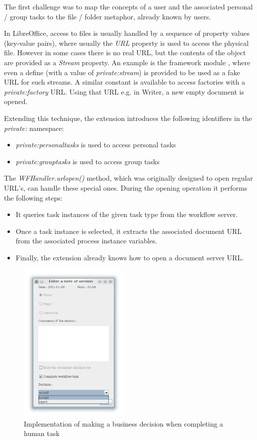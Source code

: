 The first challenge was to map the concepts of a user and the associated
personal / group tasks to the file / folder metaphor, already known by users.

In LibreOffice, access to files is usually handled by a sequence of property
values (key-value pairs), where usually the \emph{URL} property is used to
access the physical file. However in some cases there is no real URL, but the
contents of the object are provided as a \emph{Stream} property.  An example is
the framework module \cite{lo-framework-module}, where even a define (with a
value of \emph{private:stream}) is provided to be used as a fake URL for such
streams.  A similar constant is available to access factories with a
\emph{private:factory} URL. Using that URL e.g. in Writer, a new empty document
is opened.

Extending this technique, the extension introduces the following identifiers in
the \emph{private:} namespace:

\begin{itemize}
\item \emph{private:personaltasks} is used to access personal tasks
\item \emph{private:grouptasks} is used to access group tasks
\end{itemize}

The \emph{WFHandler.urlopen()} method, which was originally designed to open
regular URL's, can handle these special ones. During the opening operation it performs the following steps:

\begin{itemize}
\item It queries task instances of the given task type from the workflow server.
\item Once a task instance is selected, it extracts the associated document URL from the associated process instance variables.
\item Finally, the extension already knows how to open a document server URL.
\end{itemize}

\begin{figure}[H]
\centering
\includegraphics[width=200px,keepaspectratio]{implementation-decision.png}
\caption{Implementation of making a business decision when completing a human task}
\label{fig:implementation-decision}
\end{figure}

